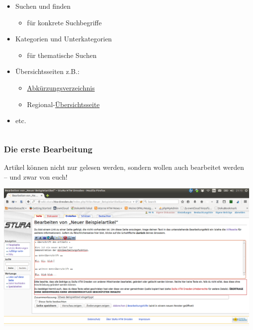 \documentclass{beamer}
\begin{document}
\begin{frame}
\begin{columns}
    \begin{column}{0.6\linewidth}
      \begin{itemize}[<+->]
      \item Suchen und finden
        \begin{itemize}
        \item für konkrete Suchbegriffe
        \end{itemize}
      \item Kategorien und Unterkategorien
        \begin{itemize}
        \item für thematische Suchen
        \end{itemize}
      \item Übersichtsseiten z.B.:
        \begin{itemize}
        \item \href{http://wiki.stura.htw-dresden.de/index.php/Kategorie:Abk\%C3\%BCrzung}{Abkürzungsverzeichnis}
        \item Regional-\href{http://food.the-empire.de/index.php/Hauptseite}{Übersichtsseite}
        \end{itemize}
      \item etc.
      \end{itemize}
    \end{column}
  
  \end{columns}
  
\end{frame}


\begin{frame}
  \frametitle{Die erste Bearbeitung}

  Artikel können nicht nur gelesen werden, sondern wollen auch bearbeitet
  werden -- und zwar von euch!

  \begin{center}
    \includegraphics[width=1\linewidth]{Wikiartikel_bearbeiten}
  \end{center}
\end{frame}
\end{document}
